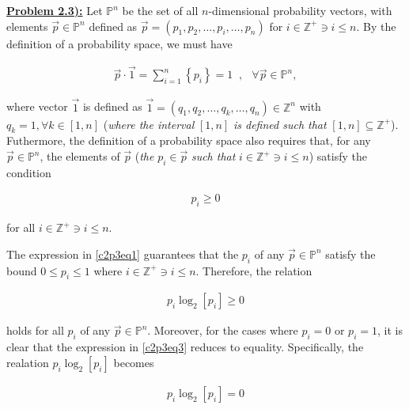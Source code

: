 \documentclass{article}[12pt]
\numberwithin{equation}{subsection}
\newcommand{\prob}[1]{\textbf{\underline{Problem #1):}}}
\begin{document}
\begin{flushleft}



\prob{2.3}  Let $\mathbb{P}^n$ be the set of all $n$-dimensional probability vectors, with elements $\vec{p} \in \mathbb{P}^n$ defined as $\vec{p} = \left( p_1, p_2, \dots, p_i, \dots, p_n \right)$ for $i \in \mathbb{Z}^+ \ni i \leq n$.  By the definition of a probability space, we must have

\begin{align} \label{c2p3eq1}
\vec{p} \cdot \vec{1} = \sum_{i = 1}^n \left\{ p_i \right\} = 1  \; \; , \; \; \, \forall \vec{p} \in \mathbb{P}^n, \tag{2.3-1}
\end{align}

where vector $\vec{1}$ is defined as $\vec{1} = \left( q_1, q_2, \dots, q_k, \dots, q_n \right) \in \mathbb{Z}^n$ with $q_k = 1, \forall k \in \left[ 1, n \right]$ (\emph{where the interval} $\left[ 1, n \right]$ \emph{is defined such that} $\left[ 1, n \right] \subseteq \mathbb{Z}^+$). Futhermore, the definition of a probability space also requires that, for any $\vec{p} \in \mathbb{P}^n$, the elements of $\vec{p}$ (\emph{the} $p_i \in \vec{p}$ \emph{such that} $i \in \mathbb{Z}^+ \ni i \leq n$) satisfy the condition

\begin{align} \label{c2p3eq2}
p_i \geq 0  \tag{2.3-2} 
\end{align}

for all $i \in \mathbb{Z}^+ \ni i \leq n$. \newline


The expression in \ref{c2p3eq1} guarantees that the $p_i$ of any $\vec{p} \in \mathbb{P}^n$ satisfy the bound $0 \leq p_i \leq 1$ where $i \in \mathbb{Z}^+ \ni i \leq n$.  Therefore, the relation

\begin{align} \label{c2p3eq3}
p_i \log_2 \left[ p_i \right] \geq 0  \tag{2.3-3}
\end{align}

holds for all $p_i$ of any $\vec{p} \in \mathbb{P}^n$.  Moreover, for the cases where $p_i = 0$ or $p_i = 1$, it is clear that the expression in \ref{c2p3eq3} reduces to equality.  Specifically, the realation $p_i \log_2 \left[ p_i \right]$ becomes

\begin{align*} \label{c2p3eq4}
p_i \log_2 \left[ p_i \right] = 0  \tag{2.3-4}
\end{align*}


\end{flushleft}
\end{document}
